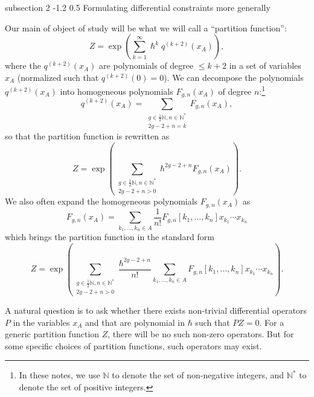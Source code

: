 \documentclass[reqno,oneside,11pt]{amsart}
\makeatletter
\theoremstyle{plain}
\theoremstyle{definition}
\theoremstyle{remark}
\numberwithin{equation}{section}
\renewcommand{\subsection}{\@startsection
{subsection}%
{2}%
{\z@}%
{-1.2\baselineskip}%
{0.5\baselineskip}%
{\normalfont \bf \normalsize}} %
\makeatother
\begin{document}
\subsection{Formulating differential constraints more generally}

Our main of object of study will be what we will call a ``partition function'':
\begin{equation}\label{eq:pf}
Z = \exp \left(\sum_{k=1}^\infty \hslash^{k} q^{(k+2)}(x_A)\right),
\end{equation}
where the $ q^{(k+2)} (x_A) $ are polynomials of degree $ \leq k+2 $ in a set of variables $ x_A $ (normalized such that $q^{(k+2)}(0) = 0$). We can decompose the polynomials $q^{(k+2)}(x_A)$ into homogeneous polynomials $F_{g,n}(x_A)$ of degree $n$:\footnote{In these notes, we use $\mathbb{N}$ to denote the set of non-negative integers, and $\mathbb{N}^*$ to denote the set of positive integers.}
\begin{equation}
q^{(k+2)}(x_A) = \sum_{\substack{g \in \frac{1}{2} \mathbb{N},  n \in \mathbb{N}^* \\ 2g-2+n=k}} F_{g,n}(x_A), 
\end{equation}
so that the partition function is rewritten as
\begin{equation}\label{eq:pfFgn}
Z = \exp\left( \sum_{\substack{g \in \frac{1}{2} \mathbb{N}, n \in \mathbb{N}^* \\ 2g-2+n > 0}} \hbar^{2g-2+n} F_{g,n}(x_A) \right).
\end{equation}
We also often expand the homogeneous polynomials $F_{g,n}(x_A)$ as
\begin{equation}
F_{g,n}(x_A) = \sum_{k_1, \ldots, k_n \in A} \frac{1}{n!} F_{g,n}[k_1, \ldots,k_n]  x_{k_1} \cdots x_{k_n}
\end{equation}
which brings the partition function in the standard form
\begin{equation}\label{eq:pfFgncoeff}
Z = \exp\left( \sum_{\substack{g \in \frac{1}{2} \mathbb{N}, n \in \mathbb{N}^* \\ 2g-2+n > 0}} \frac{\hbar^{2g-2+n}}{n!}  \sum_{k_1, \ldots, k_n \in A}  F_{g,n}[k_1, \ldots,k_n]  x_{k_1} \cdots x_{k_n}\right).
\end{equation}

A natural question is to ask whether there exists non-trivial differential operators $P$ in the variables $x_A$ and that are polynomial in $\hbar$ such that $P Z = 0$. For a generic partition function $Z$, there will be no such non-zero operators. But for some specific choices of partition functions, such operators may exist. 
\end{document}
